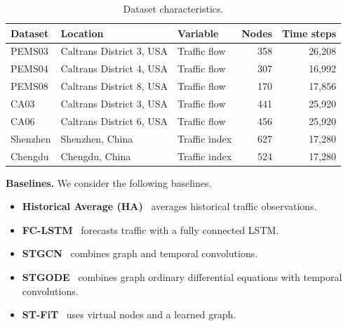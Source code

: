 \documentclass[runningheads,a4paper]{llncs}
\begin{document}
\begin{table}[!ht]
\centering
\DeclareRobustCommand{\datasetstatisticstable}{%
\caption{Dataset characteristics.}
\label{tab:datasets}
\footnotesize
\setlength{\tabcolsep}{1pt}
\renewcommand{\arraystretch}{1.1}
\begin{tabular*}{\linewidth}{@{\extracolsep{\fill}}lllrr@{}}
\hline
Dataset & Location & Variable & Nodes & Time steps \\
\hline
PEMS03 & Caltrans District 3, USA & Traffic flow & 358 & 26,208 \\
PEMS04 & Caltrans District 4, USA & Traffic flow & 307 & 16,992 \\
PEMS08 & Caltrans District 8, USA & Traffic flow & 170 & 17,856 \\
CA03 & Caltrans District 3, USA & Traffic flow & 441 & 25,920 \\
CA06 & Caltrans District 6, USA & Traffic flow & 456 & 25,920 \\
Shenzhen & Shenzhen, China & Traffic index & 627 & 17,280 \\
Chengdu & Chengdu, China & Traffic index & 524 & 17,280 \\
\hline
\end{tabular*}%
}
\datasetstatisticstable
\end{table}

\begingroup
\DeclareRobustCommand{\baselinecomparison}{%
  \noindent\textbf{Baselines.} We consider the following baselines.
  \begin{itemize}
  \item \textbf{Historical Average (HA)}~\cite{dai2020hstgcn} averages historical traffic observations.
  \item \textbf{FC-LSTM}~\cite{sutskever2014seq2seq} forecasts traffic with a fully connected LSTM.
  \item \textbf{STGCN}~\cite{stgcn} combines graph and temporal convolutions.
  \item \textbf{STGODE}~\cite{fang2021stgode} combines graph ordinary differential equations with temporal convolutions.
  \item \textbf{ST-FiT}~\cite{stfit} uses virtual nodes and a learned graph.
  \end{itemize}%
}
\begin{samepage}
\baselinecomparison
\end{samepage}
\endgroup
\end{document}
